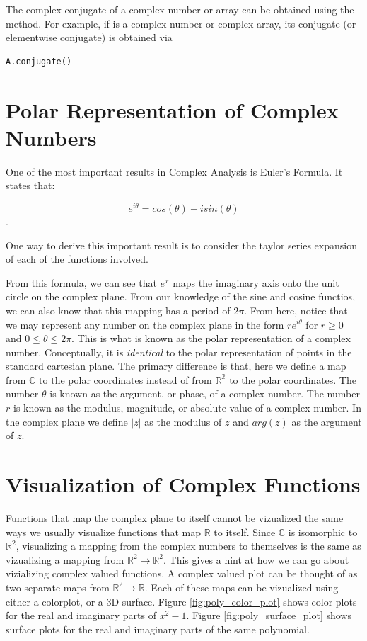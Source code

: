 The complex conjugate of a complex number or array can be obtained using the  method.
For example, if  is a complex number or complex array, its conjugate (or elementwise conjugate) is obtained via
\begin{lstlisting}
A.conjugate()
\end{lstlisting}

\section*{Polar Representation of Complex Numbers}

One of the most important results in Complex Analysis is Euler's Formula.
It states that:

$$e^{i\theta}=cos(\theta)+i sin(\theta)$$.

One way to derive this important result is to consider the taylor series expansion of each of the functions involved.

From this formula, we can see that $e^x$ maps the imaginary axis onto the unit circle on the complex plane.
From our knowledge of the sine and cosine functios, we can also know that this mapping has a period of $2\pi$.
From here, notice that we may represent any number on the complex plane in the form $r e^{i\theta}$ for $r\geq 0$ and $0 \leq \theta \leq 2\pi$.
This is what is known as the polar representation of a complex number.
Conceptually, it is \emph{identical} to the polar representation of points in the standard cartesian plane.
The primary difference is that, here we define a map from $\mathbb{C}$ to the polar coordinates instead of from $\mathbb{R^2}$ to the polar coordinates.
The number $\theta$ is known as the argument, or phase, of a complex number.
The number $r$ is known as the modulus, magnitude, or absolute value of a complex number.
In the complex plane we define $|z|$ as the modulus of $z$ and $arg(z)$ as the argument of $z$.

\section*{Visualization of Complex Functions}
Functions that map the complex plane to itself cannot be vizualized the same ways we usually visualize functions that map $\mathbb{R}$ to itself.
Since $\mathbb{C}$ is isomorphic to $\mathbb{R}^2$, visualizing a mapping from the complex numbers to themselves is the same as vizualizing a mapping from $\mathbb{R}^2 \to \mathbb{R}^2$.
This gives a hint at how we can go about vizializing complex valued functions.
A complex valued plot can be thought of as two separate maps from $\mathbb{R}^2 \to \mathbb{R}$.
Each of these maps can be vizualized using either a colorplot, or a 3D surface.
Figure \ref{fig:poly_color_plot} shows color plots for the real and imaginary parts of $x^2 - 1$.
Figure \ref{fig:poly_surface_plot} shows surface plots for the real and imaginary parts of the same polynomial.

